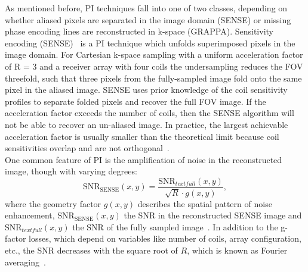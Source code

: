 As mentioned before, PI techniques fall into one of two classes, depending on whether aliased pixels are separated in the image domain (SENSE) or missing phase encoding lines are reconstructed in k-space (GRAPPA). Sensitivity encoding (SENSE)~\cite{SENSE1} is a PI technique which unfolds superimposed pixels in the image domain. For Cartesian k-space sampling with a uniform acceleration factor of R = 3 and a receiver array with four coils the undersampling reduces the FOV threefold, such that three pixels from the fully-sampled image fold onto the same pixel in the aliased image. SENSE uses prior knowledge of the coil sensitivity profiles to separate folded pixels and recover the full FOV image. 
If the acceleration factor exceeds the number of coils, then the
SENSE 
algorithm will not be able to recover an un-aliased image.
In practice, the largest achievable acceleration factor is usually smaller than the theoretical limit because coil sensitivities overlap and are not orthogonal~\cite{AdvancesPI}.\\
One common feature of PI is the amplification of noise in the reconstructed image, though with varying degrees:
\begin{equation} \label{eq:SNR-SENSE}
	\text{SNR}_{\text{SENSE}}(x,y) = \frac{\text{SNR}_{text{full}}(x,y)}{\sqrt{R} \cdot g(x,y)},
\end{equation}
where the geometry factor $g(x,y)$ describes the spatial pattern of noise enhancement, $\text{SNR}_{\text{SENSE}}(x,y)$ the SNR in the reconstructed SENSE image and $\text{SNR}_{text{full}}(x,y)$ the SNR of the fully sampled image~\cite{AdvancesPI}. In addition to the g-factor losses, which depend on variables like number of coils, array configuration, etc., the SNR decreases with the square root of $R$, which is known as Fourier averaging~\cite{AdvancesPI}.\\
